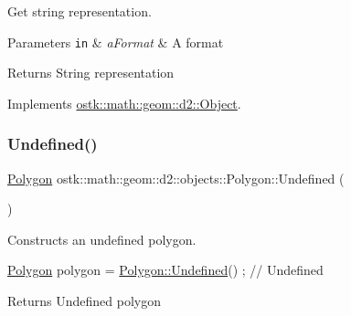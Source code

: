 Get string representation. 


\begin{DoxyParams}[1]{Parameters}
\mbox{\tt in}  & {\em a\+Format} & A format \\
\hline
\end{DoxyParams}
\begin{DoxyReturn}{Returns}
String representation 
\end{DoxyReturn}


Implements \hyperlink{classostk_1_1math_1_1geom_1_1d2_1_1_object_ada4c2187dd24ef02b91b6346191f677c}{ostk\+::math\+::geom\+::d2\+::\+Object}.

\mbox{\label{classostk_1_1math_1_1geom_1_1d2_1_1objects_1_1_polygon_af260e109c9315fd31f7f24f3154dcbf2}} 
\subsubsection{\texorpdfstring{Undefined()}{Undefined()}}
{\footnotesize\ttfamily \hyperlink{classostk_1_1math_1_1geom_1_1d2_1_1objects_1_1_polygon}{Polygon} ostk\+::math\+::geom\+::d2\+::objects\+::\+Polygon\+::\+Undefined (\begin{DoxyParamCaption}{ }\end{DoxyParamCaption})\hspace{0.3cm}{\ttfamily [static]}}



Constructs an undefined polygon. 


\begin{DoxyCode}
\hyperlink{classostk_1_1math_1_1geom_1_1d2_1_1objects_1_1_polygon_adaf9ef564754ab10ed3dd0d5fa0d90ea}{Polygon} polygon = \hyperlink{classostk_1_1math_1_1geom_1_1d2_1_1objects_1_1_polygon_af260e109c9315fd31f7f24f3154dcbf2}{Polygon::Undefined}() ; \textcolor{comment}{// Undefined}
\end{DoxyCode}


\begin{DoxyReturn}{Returns}
Undefined polygon 
\end{DoxyReturn}
\mbox{\label{classostk_1_1math_1_1geom_1_1d2_1_1objects_1_1_polygon_ad01feda42e80b74752d3529bc122981b}} 
